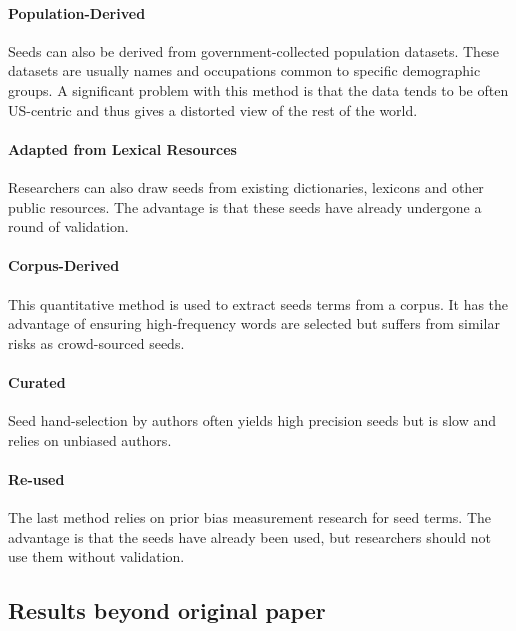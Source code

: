 \paragraph{Population-Derived} Seeds can also be derived from government-collected population
datasets. These datasets are usually names and occupations common to specific demographic groups.
A significant problem with this method is that the data tends to be often US-centric and thus gives
a distorted view of the rest of the world.

\paragraph{Adapted from Lexical Resources} Researchers can also draw seeds from existing
dictionaries, lexicons and other public resources. The advantage is that these seeds have already
undergone a round of validation.

\paragraph{Corpus-Derived} This quantitative method is used to extract seeds terms from a corpus. It
has the advantage of ensuring high-frequency words are selected but suffers from similar risks as
crowd-sourced seeds.

\paragraph{Curated} Seed hand-selection by authors often yields high precision seeds but is slow and
relies on unbiased authors.

\paragraph{Re-used} The last method relies on prior bias measurement research for seed terms. The
advantage is that the seeds have already been used, but researchers should not use them without
validation.

\subsection{Results beyond original paper}

